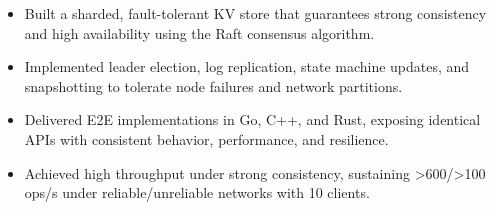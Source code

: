 


\begin{itemize}[nosep]
  \item Built a sharded, fault-tolerant KV store that guarantees strong consistency and high availability using the Raft consensus algorithm.
  \item Implemented leader election, log replication, state machine updates, and snapshotting to tolerate node failures and network partitions.
  \item Delivered E2E implementations in Go, C++, and Rust, exposing identical APIs with consistent behavior, performance, and resilience.
  \item Achieved high throughput under strong consistency, sustaining >600/>100 ops/s under reliable/unreliable networks with 10 clients.
\end{itemize}
